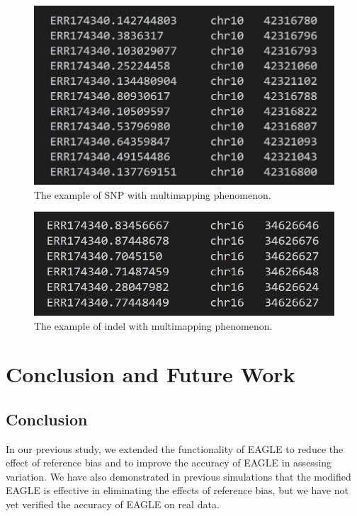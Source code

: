 \documentclass[PhD]{PHlab-thesis}
\begin{document}
\begin{figure}[h!]
	\centering
	\includegraphics[scale=0.4]{figures/chr10mulltimapping.jpg}
	\caption{The example of SNP with multimapping phenomenon.}
	\label{fig:The example of SNP with multimapping phenomenon} %
\end{figure}

\begin{figure}[h!]
	\centering
	\includegraphics[scale=0.4]{figures/indelmulltimapping.jpg}
	\caption{The example of indel with multimapping phenomenon.}
	\label{fig:The example of indel with multimapping phenomenon} %
\end{figure}

\chapter{Conclusion and Future Work}
\section{Conclusion}
In our previous study, we extended the functionality of EAGLE to reduce the effect of reference bias and to improve the accuracy of EAGLE in assessing variation. We have also demonstrated in previous simulations that the modified EAGLE is effective in eliminating the effects of reference bias, but we have not yet verified the accuracy of EAGLE on real data.
\end{document}
